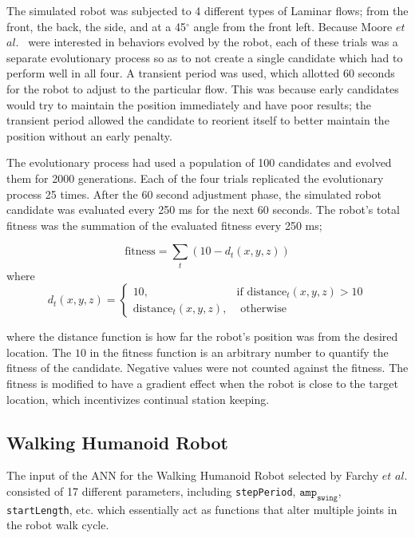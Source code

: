 \documentclass{sig-alternate}
\begin{document}
 The simulated robot was subjected to 4 different types of Laminar flows; from the front, the back, the side, and at a 45$^\circ$ angle from the front left. Because Moore $et$ $al.$~\cite{Moore:2013:ESK:2463372.2463402} were interested in behaviors evolved by the robot, each of these trials was a separate evolutionary process so as to not create a single candidate which had to perform well in all four. A transient period was used, which allotted 60 seconds for the robot to adjust to the particular flow. This was because early candidates would try to maintain the position immediately and have poor results; the transient period allowed the candidate to reorient itself to better maintain the position without an early penalty. 
 
 The evolutionary process had used a population of 100 candidates and evolved them for 2000 generations. Each of the four trials replicated the evolutionary process 25 times. After the 60 second adjustment phase, the simulated robot candidate was evaluated every 250 ms for the next 60 seconds. The robot's total fitness was the summation of the evaluated fitness every 250 ms;

\begin{equation*}
	\textrm{fitness} = \sum_{t} (10 - d_t(x, y, z))
\end{equation*}
where
\[
	d_t(x, y, z) = 
		\begin{cases} 10, & \textrm{if distance}_t(x, y, z) > 10 \\
					  \textrm{distance}_t(x, y, z), & \textrm{ otherwise}
		\end{cases}
\]
 
 
  where the distance function is how far the robot's position was from the desired location. The $10$ in the fitness function is an arbitrary number to quantify the fitness of the candidate. Negative values were not counted against the fitness. The fitness is modified to have a gradient effect when the robot is close to the target location, which incentivizes continual station keeping.  
 
  \subsection{Walking Humanoid Robot}\label{Farchy Evolving}
  The input of the ANN for the Walking Humanoid Robot selected by Farchy $et$ $al.$ consisted of 17 different parameters, including \texttt{stepPeriod}, $\texttt{amp}_\texttt{swing}$, \texttt{startLength}, etc. which essentially act as functions that alter multiple joints in the robot walk cycle.
 
\end{document}
